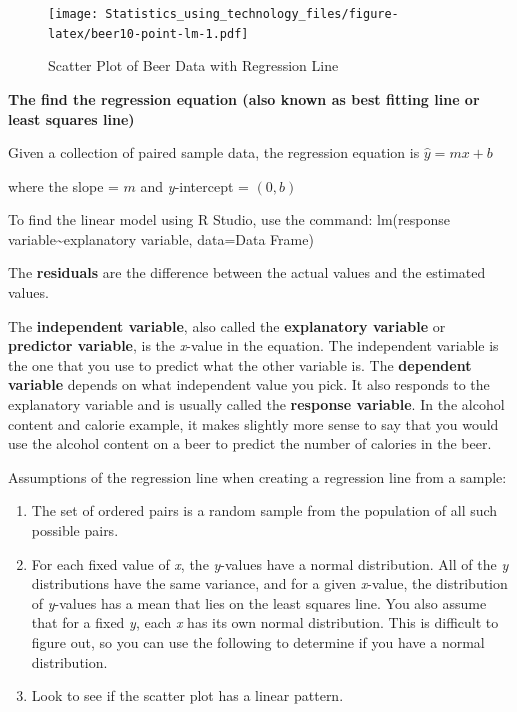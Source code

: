 \documentclass[]{book}
\newenvironment{Shaded}{\begin{snugshade}}{\end{snugshade}}
\newcommand{\DataTypeTok}[1]{\textcolor[rgb]{0.13,0.29,0.53}{#1}}
\newcommand{\KeywordTok}[1]{\textcolor[rgb]{0.13,0.29,0.53}{\textbf{#1}}}
\newcommand{\NormalTok}[1]{#1}
\newcommand{\OperatorTok}[1]{\textcolor[rgb]{0.81,0.36,0.00}{\textbf{#1}}}
\newcommand{\StringTok}[1]{\textcolor[rgb]{0.31,0.60,0.02}{#1}}
\begin{document}
\begin{Shaded}
\end{Shaded}

\begin{figure}
\centering
\texttt{[image: Statistics\_using\_technology\_files/figure-latex/beer10-point-lm-1.pdf]}
\caption{\label{fig:beer10-point-lm}Scatter Plot of Beer Data with Regression Line}
\end{figure}

\textbf{The find the regression equation (also known as best fitting line or least squares line)}

Given a collection of paired sample data, the regression equation is \(\hat{y}=mx+b\)

where the slope = \(m\) and \emph{y}-intercept = \((0,b)\)

To find the linear model using R Studio, use the command: lm(response variable\textasciitilde{}explanatory variable, data=Data Frame)

The \textbf{residuals} are the difference between the actual values and the estimated values.

The \textbf{independent variable}, also called the \textbf{explanatory variable} or \textbf{predictor variable}, is the \emph{x}-value in the equation. The independent variable is the one that you use to predict what the other variable is. The \textbf{dependent variable} depends on what independent value you pick. It also responds to the explanatory variable and is usually called the \textbf{response variable}. In the alcohol content and calorie example, it makes slightly more sense to say that you would use the alcohol content on a beer to predict the number of calories in the beer.

Assumptions of the regression line when creating a regression line from a sample:

\begin{enumerate}
\def\labelenumi{\alph{enumi}.}
\item
  The set of ordered pairs is a random sample from the population of all such possible pairs.
\item
  For each fixed value of \emph{x}, the \emph{y}-values have a normal distribution. All of the \emph{y} distributions have the same variance, and for a given \emph{x}-value, the distribution of \emph{y}-values has a mean that lies on the least squares line. You also assume that for a fixed \emph{y}, each \emph{x} has its own normal distribution. This is difficult to figure out, so you can use the following to determine if you have a normal distribution.
\item
  Look to see if the scatter plot has a linear pattern.
\end{enumerate}
\end{document}
